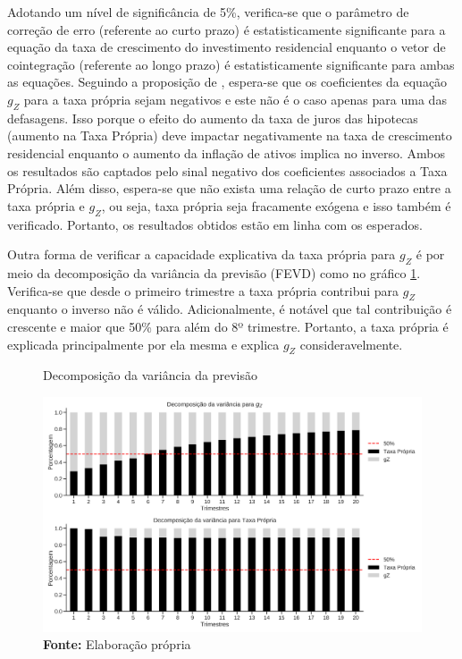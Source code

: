 Adotando um nível de significância de 5\%, verifica-se que o parâmetro de correção de erro (referente ao curto prazo) é estatisticamente significante para a equação da taxa de crescimento do investimento residencial enquanto o vetor de cointegração (referente ao longo prazo) é estatisticamente significante para ambas as equações. Seguindo a proposição de \textcite{teixeira_crescimento_2015}, espera-se que os coeficientes da equação $g_Z$ para a taxa própria sejam negativos e este não é o caso apenas para uma das defasagens. Isso porque o efeito do aumento da taxa de juros das hipotecas (aumento na Taxa Própria) deve impactar negativamente na taxa de crescimento residencial enquanto o aumento da inflação de ativos implica no inverso. Ambos os resultados são captados pelo sinal negativo dos coeficientes associados a Taxa Própria.
Além disso, espera-se que não exista uma relação de curto prazo entre a taxa própria e $g_Z$, ou seja, taxa própria seja fracamente exógena e isso também é verificado. Portanto, os resultados obtidos estão em linha com os esperados. 

Outra forma de verificar a capacidade explicativa da taxa própria para $g_Z$ é por meio da decomposição da variância da previsão (FEVD) como no gráfico \ref{fevd}. Verifica-se que desde o primeiro trimestre a taxa própria contribui para $g_Z$ enquanto o inverso não é válido. Adicionalmente, é notável que tal contribuição é crescente e maior que 50\% para além do 8º trimestre. Portanto, a taxa própria é explicada principalmente por ela mesma e explica $g_Z$ consideravelmente.

\begin{figure}[H]
	\centering
	\caption{Decomposição da variância da previsão}
	\label{fevd}
	\includegraphics[width=\textwidth]{../../Modelo/SeriesTemporais/figs/FEVD_VECM.png}
	\caption*{\textbf{Fonte:} Elaboração própria}
\end{figure}


